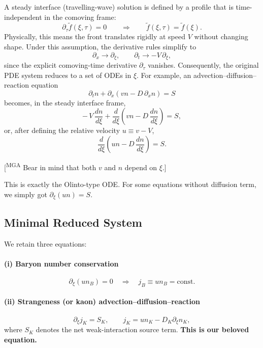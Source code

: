 \documentclass[11pt]{article}
\newcommand{\mgacom}[1]{\textsf{\color[rgb]{0.75,0,0}[\textsuperscript{MGA} #1]}}
\begin{document}
A steady interface (travelling-wave) solution is defined by a profile that is
time-independent in the comoving frame:
\begin{equation}
\partial_\tau \tilde f(\xi,\tau)=0
\qquad \Rightarrow \qquad
\tilde f(\xi,\tau)=\tilde f(\xi).
\end{equation}
Physically, this means the front translates rigidly at speed $V$ without
changing shape. Under this assumption, the derivative rules simplify to
\begin{equation}
\boxed{
\partial_x \to \partial_\xi,
\qquad
\partial_t \to -V\,\partial_\xi,
}
\end{equation}
since the explicit comoving-time derivative $\partial_\tau$ vanishes.
Consequently, the original PDE system reduces to a set of ODEs in $\xi$.
For example, an advection--diffusion--reaction equation
\begin{equation}
\partial_t n + \partial_x\!\left(v n - D\,\partial_x n\right)=S
\end{equation}
becomes, in the steady interface frame,
\begin{equation}
-\,V\,\frac{dn}{d\xi}
+
\frac{d}{d\xi}\!\left(v n - D\,\frac{dn}{d\xi}\right)
=
S,
\end{equation}
or, after defining the relative velocity $u\equiv v-V$,
\begin{equation}
\frac{d}{d\xi}\!\left(u n - D\,\frac{dn}{d\xi}\right)=S.
\end{equation}

\mgacom{Bear in mind that both $v$ and $n$ depend on $\xi$.}

This is exactly the Olinto-type ODE. For some equations without diffusion term, we simply got $\partial_\xi (un) = S$.

\subsection{Minimal Reduced System}

We retain three equations:

\paragraph{(i) Baryon number conservation}
\begin{equation}
\partial_\xi (u n_B) = 0
\quad \Rightarrow \quad
j_B \equiv u n_B = \text{const}.
\end{equation}

\paragraph{(ii) Strangeness (or kaon) advection--diffusion--reaction}
\begin{equation}
\partial_\xi j_K = S_K,
\qquad
j_K = u n_K - D_K \partial_\xi n_K,
\end{equation}
where $S_K$ denotes the net weak-interaction source term. \textbf{This is our beloved equation.}
\end{document}
